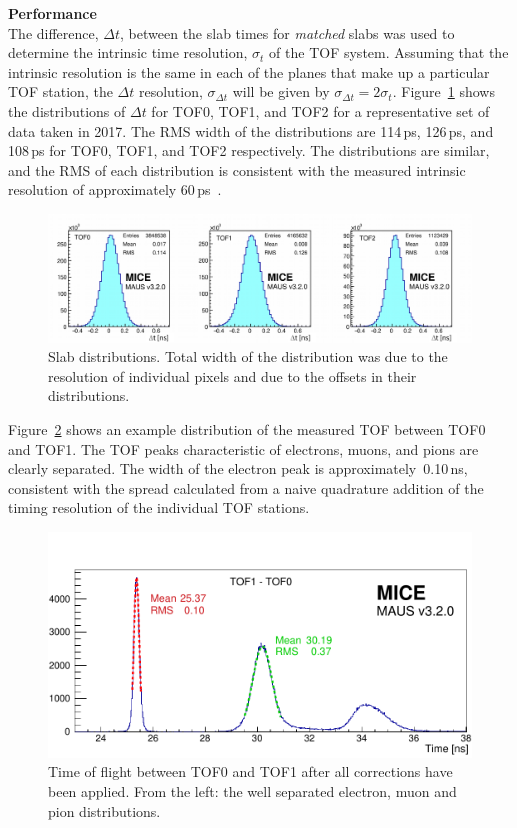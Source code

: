 \noindent\textbf{Performance} \\
\noindent
The difference, $\Delta t$, between the slab times for \textit{matched} slabs
was used to determine the intrinsic time resolution, $\sigma_t$ of the
TOF system.
Assuming that the intrinsic resolution is the same in each of the
planes that make up a particular TOF station, the $\Delta t$
resolution, $\sigma_{\Delta t}$ will be given by
$\sigma_{\Delta t}=2\sigma_t$.
Figure~\ref{fig:SlabDtAll} shows the distributions of $\Delta t$ for
TOF0, TOF1, and TOF2 for a representative set of data taken in 2017.
The RMS width of the distributions are 114\,ps, 126\,ps, and 108\,ps
for TOF0, TOF1, and TOF2 respectively.
The distributions are similar, and the RMS of each distribution is
consistent with the measured intrinsic resolution of approximately
60\,ps~\cite{2010NIMPA.615...14B}.
\begin{figure}[htb]
  \begin{center}
    \includegraphics[width=0.9\columnwidth]{07_overall_slab_dt_edited2.pdf}
  \end{center}
  \caption{
    Slab \Dt{} distributions.
    Total width of the distribution was due to the resolution of
    individual pixels and due to the offsets in their \Dt{}
    distributions.
  }
  \label{fig:SlabDtAll}
\end{figure}

Figure~\ref{fig:TOF_peaks} shows an example distribution of the
measured TOF between TOF0 and TOF1.
The TOF peaks characteristic of electrons, muons, and pions are
clearly separated.
The width of the electron peak is approximately~0.10\,ns,
consistent with the spread calculated from a naive quadrature addition
of the timing resolution of the individual TOF stations.
\begin{figure}
  \begin{center}
    \includegraphics[width=0.6\columnwidth]{TOF_peaks.pdf}
  \end{center}
  \caption{
    Time of flight between TOF0 and TOF1 after all corrections have
    been applied. From the left: the well separated electron, muon and
    pion distributions.
  } 
  \label{fig:TOF_peaks}
\end{figure}
